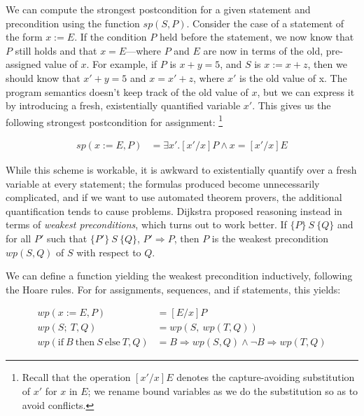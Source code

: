 \documentclass[11pt]{article}
\begin{document}
We can compute the strongest postcondition for a given statement and
precondition using the function $sp(S, P)$.  Consider the case of a statement of
the form $x := E$.  If the condition $P$ held before the statement, we now know
that $P$ still holds and that $x=E$---where $P$ and $E$ are now in terms of the
old, pre-assigned value of $x$.  For example, if $P$ is $x + y = 5$, and $S$ is
$x := x + z$, then we should know that $x' + y = 5$ and $x = x' + z$, where $x'$
is the old value of x.  The program semantics doesn't keep track of the old
value of $x$, but we can express it by introducing a fresh, existentially
quantified variable $x'$.  This gives us the following strongest postcondition
for assignment:%
\footnote{Recall that the operation $[x'/x]E$ denotes the capture-avoiding substitution of
$x'$ for $x$ in $E$; we rename bound variables as we do the substitution so as to
avoid conflicts.}

\[
\begin{array}{ll}
sp(x := E, P) & = \exists x' . [x'/x]P \land x = [x'/x]E
\end{array}
\]


While this scheme is workable, it is awkward to existentially quantify over a
fresh variable at every statement; the formulas produced become unnecessarily
complicated, and if we want to use automated theorem provers, the additional
quantification tends to cause problems.  Dijkstra proposed reasoning instead in
terms of \textit{weakest preconditions}, which turns out to work better.
If $\{P\} ~S~ \{Q\}$ and for all $P'$ such that $\{P'\} ~S~ \{Q\}$, $P'
\Rightarrow P$, then $P$ is the weakest precondition $wp(S,Q)$ of $S$ with
respect to $Q$.

\iffalse \textbf{WORKSHEET EXAMPLES} \fi


We can define a function yielding the weakest precondition inductively,
following the Hoare rules.  For for assignments, sequences, and if
statements, this yields:

\[
\begin{array}{ll}
wp(x := E, P) & = [E/x] P
\\[1ex]
wp(S;~ T, Q) & = wp(S, ~wp(T, Q))
\\[1ex]
wp(\mbox{if}~ B ~\mbox{then}~ S ~\mbox{else}~ T, Q) & = B \Rightarrow wp(S,Q) \land \lnot B \Rightarrow wp(T,Q)
\end{array}
\]
\iffalse
\textbf{PROBABLY DON'T HAVE TIME:}
 exercise:
 Fill in the missing pre- or post-conditions with predicates that make each Hoare triple valid.
 {x=y} x:=y*2 {      }
 {      } x:=x+3{x=z}
 {       } x:=x+1;y:=y*x{y=2*z}
 {       } if (x>0) then y:=x else y:=0 {y>0}
\fi
\end{document}
